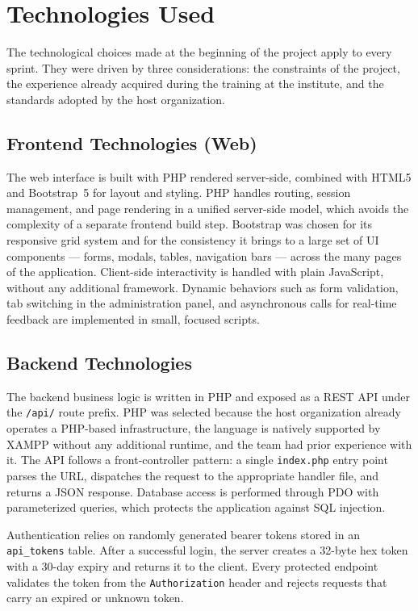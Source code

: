 \section{Technologies Used}

The technological choices made at the beginning of the project apply to every sprint. They were driven by three considerations: the constraints of the project, the experience already acquired during the training at the institute, and the standards adopted by the host organization.

\subsection{Frontend Technologies (Web)}

The web interface is built with PHP rendered server-side, combined with HTML5 and Bootstrap~5 for layout and styling. PHP handles routing, session management, and page rendering in a unified server-side model, which avoids the complexity of a separate frontend build step. Bootstrap was chosen for its responsive grid system and for the consistency it brings to a large set of UI components --- forms, modals, tables, navigation bars --- across the many pages of the application. Client-side interactivity is handled with plain JavaScript, without any additional framework. Dynamic behaviors such as form validation, tab switching in the administration panel, and asynchronous calls for real-time feedback are implemented in small, focused scripts.

\subsection{Backend Technologies}

The backend business logic is written in PHP and exposed as a REST API under the \texttt{/api/} route prefix. PHP was selected because the host organization already operates a PHP-based infrastructure, the language is natively supported by XAMPP without any additional runtime, and the team had prior experience with it. The API follows a front-controller pattern: a single \texttt{index.php} entry point parses the URL, dispatches the request to the appropriate handler file, and returns a JSON response. Database access is performed through PDO with parameterized queries, which protects the application against SQL injection.

Authentication relies on randomly generated bearer tokens stored in an \texttt{api\_tokens} table. After a successful login, the server creates a 32-byte hex token with a 30-day expiry and returns it to the client. Every protected endpoint validates the token from the \texttt{Authorization} header and rejects requests that carry an expired or unknown token.

